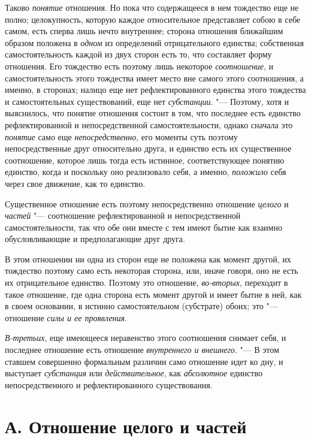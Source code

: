 Таково {\em понятие} отношения. Но пока что содержащееся
в нем тождество еще не полно; целокупность, которую каждое относительное
представляет собою в себе самом, есть сперва лишь нечто внутреннее; сторона
отношения ближайшим образом положена в {\em одном} из
определений отрицательного единства; собственная самостоятельность каждой
из двух сторон есть то, что составляет форму отношения. Его тождество есть
поэтому лишь некоторое {\em соотношение}, и
самостоятельность этого тождества имеет место вне самого этого соотношения,
а именно, в сторонах; налицо еще нет рефлектированного единства этого
тождества и самостоятельных существований, еще нет
{\em субстанции}. "--- Поэтому, хотя и выяснилось, что
понятие отношения состоит в том, что последнее есть единство
рефлектированной и непосредственной самостоятельности, однако сначала это
{\em понятие} само еще {\em непосредственно}, его моменты суть поэтому
непосредственные друг относительно друга, и единство есть их существенное
соотношение, которое лишь тогда есть истинное, соответствующее понятию
единство, когда и поскольку оно реализовало себя, а именно,
{\em положило} себя через свое движение, как то единство.

Существенное отношение есть поэтому непосредственно отношение
{\em целого} и {\em частей}
"--- соотношение рефлектированной и непосредственной самостоятельности, так
что обе они вместе с тем имеют бытие как взаимно обусловливающие и
предполагающие друг друга.

В этом отношении ни одна из сторон еще не положена как момент другой, их
тождество поэтому само есть некоторая сторона, или, иначе говоря, оно не
есть их отрицательное единство. Поэтому это отношение,
{\em во-вторых}, переходит в такое отношение, где одна
сторона есть момент другой и имеет бытие в ней, как в своем основании, в
истинно самостоятельном (субстрате) обоих; это "--- отношение
{\em силы и ее проявления}.

{\em В-третьих}, еще имеющееся неравенство этого
соотношения снимает себя, и последнее отношение есть отношение
{\em внутреннего и внешнего}. "--- В этом ставшем
совершенно формальным различии само отношение идет ко дну, и выступает
{\em субстанция} или {\em действительное}, как
{\em абсолютное} единство непосредственного и рефлектированного существования.


\section[А. Отношение целого и частей]{А. Отношение целого и частей}

